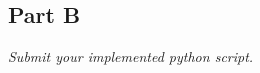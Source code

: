 \documentclass[12pt,twoside]{article}
\begin{document}
\begin{problems}
\section*{Part B}

\emph{Submit your implemented python script.}

\end{problems}
\end{document}
